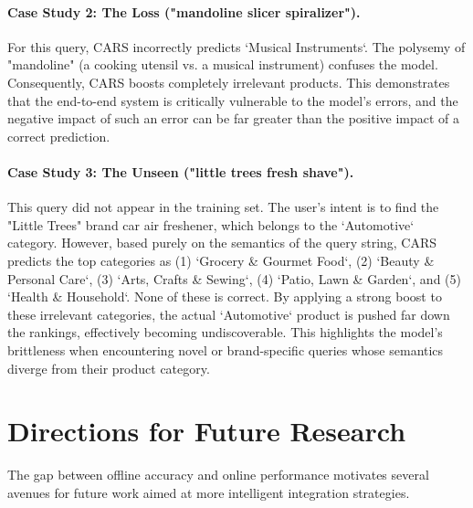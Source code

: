\documentclass[12pt, a4paper]{article}
\begin{document}
\paragraph{Case Study 2: The Loss ("mandoline slicer spiralizer").}
For this query, CARS incorrectly predicts `Musical Instruments`. The polysemy of "mandoline" (a cooking utensil vs. a musical instrument) confuses the model. Consequently, CARS boosts completely irrelevant products. This demonstrates that the end-to-end system is critically vulnerable to the model's errors, and the negative impact of such an error can be far greater than the positive impact of a correct prediction.

\paragraph{Case Study 3: The Unseen ("little trees fresh shave").}
This query did not appear in the training set. The user's intent is to find the "Little Trees" brand car air freshener, which belongs to the `Automotive` category. However, based purely on the semantics of the query string, CARS predicts the top categories as (1) `Grocery \& Gourmet Food`, (2) `Beauty \& Personal Care`, (3) `Arts, Crafts \& Sewing`, (4) `Patio, Lawn \& Garden`, and (5) `Health \& Household`. None of these is correct. By applying a strong boost to these irrelevant categories, the actual `Automotive` product is pushed far down the rankings, effectively becoming undiscoverable. This highlights the model's brittleness when encountering novel or brand-specific queries whose semantics diverge from their product category.

\section{Directions for Future Research}
The gap between offline accuracy and online performance motivates several avenues for future work aimed at more intelligent integration strategies.
\end{document}
